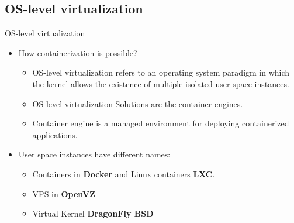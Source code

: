 \subsection{OS-level virtualization}\label{subsec:os-level-virtualization}
\begin{frame}{OS-level virtualization}
    \begin{itemize}[<+- | alert@+>]
        \item How containerization is possible?
        \begin{itemize}
            \item OS-level virtualization refers to an operating system paradigm in which the kernel allows the existence of multiple isolated user space instances.
            \item OS-level virtualization Solutions are the container engines.
            \item Container engine is a managed environment for deploying containerized applications.
        \end{itemize}
        \item User space instances have different names:
        \begin{itemize}
            \item Containers in \textbf{Docker} and Linux containers \textbf{LXC}.
            \item VPS in \textbf{OpenVZ}
            \item Virtual Kernel \textbf{DragonFly BSD}
        \end{itemize}
    \end{itemize}
\end{frame}
